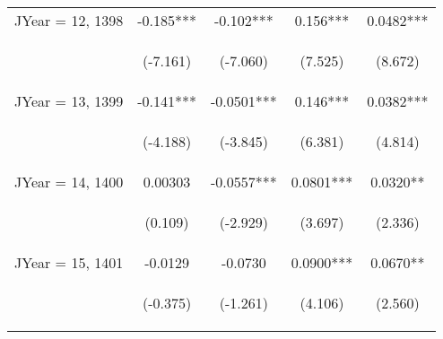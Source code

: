 \documentclass[]{article}
\begin{document}
\begin{center}
\begin{tabular}{lcccc}
JYear = 12, 1398 & -0.185*** & -0.102*** & 0.156*** & 0.0482*** \\
\vspace{4pt} & \begin{footnotesize}(-7.161)\end{footnotesize} & \begin{footnotesize}(-7.060)\end{footnotesize} & \begin{footnotesize}(7.525)\end{footnotesize} & \begin{footnotesize}(8.672)\end{footnotesize} \\
JYear = 13, 1399 & -0.141*** & -0.0501*** & 0.146*** & 0.0382*** \\
\vspace{4pt} & \begin{footnotesize}(-4.188)\end{footnotesize} & \begin{footnotesize}(-3.845)\end{footnotesize} & \begin{footnotesize}(6.381)\end{footnotesize} & \begin{footnotesize}(4.814)\end{footnotesize} \\
JYear = 14, 1400 & 0.00303 & -0.0557*** & 0.0801*** & 0.0320** \\
\vspace{4pt} & \begin{footnotesize}(0.109)\end{footnotesize} & \begin{footnotesize}(-2.929)\end{footnotesize} & \begin{footnotesize}(3.697)\end{footnotesize} & \begin{footnotesize}(2.336)\end{footnotesize} \\
JYear = 15, 1401 & -0.0129 & -0.0730 & 0.0900*** & 0.0670** \\
\vspace{4pt} & \begin{footnotesize}(-0.375)\end{footnotesize} & \begin{footnotesize}(-1.261)\end{footnotesize} & \begin{footnotesize}(4.106)\end{footnotesize} & \begin{footnotesize}(2.560)\end{footnotesize} \\

\end{tabular}
\end{center}
\end{document}
